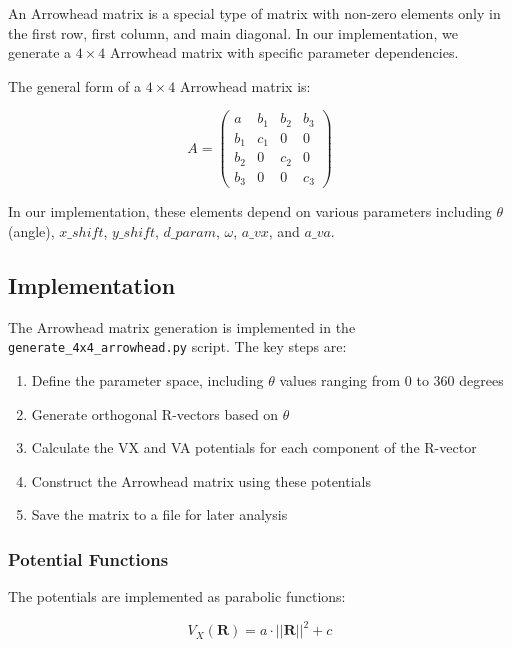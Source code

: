\documentclass{article}
\begin{document}
An Arrowhead matrix is a special type of matrix with non-zero elements only in the first row, first column, and main diagonal. In our implementation, we generate a $4 \times 4$ Arrowhead matrix with specific parameter dependencies.

The general form of a $4 \times 4$ Arrowhead matrix is:

\begin{equation}
A = \begin{pmatrix}
a & b_1 & b_2 & b_3 \\
b_1 & c_1 & 0 & 0 \\
b_2 & 0 & c_2 & 0 \\
b_3 & 0 & 0 & c_3
\end{pmatrix}
\end{equation}

In our implementation, these elements depend on various parameters including $\theta$ (angle), $x\_shift$, $y\_shift$, $d\_param$, $\omega$, $a\_vx$, and $a\_va$.

\subsection{Implementation}

The Arrowhead matrix generation is implemented in the \texttt{generate\_4x4\_arrowhead.py} script. The key steps are:

\begin{enumerate}
    \item Define the parameter space, including $\theta$ values ranging from 0 to 360 degrees
    \item Generate orthogonal R-vectors based on $\theta$
    \item Calculate the VX and VA potentials for each component of the R-vector
    \item Construct the Arrowhead matrix using these potentials
    \item Save the matrix to a file for later analysis
\end{enumerate}

\subsubsection{Potential Functions}

The potentials are implemented as parabolic functions:

\begin{equation}
V_X(\mathbf{R}) = a \cdot ||\mathbf{R}||^2 + c
\end{equation}
\end{document}

